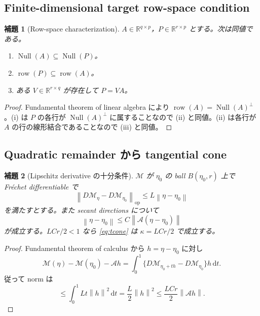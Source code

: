 \documentclass[11pt,a4paper]{ltjsarticle}
\newtheorem{lemma}{補題}[section]
\theoremstyle{remark}
\newcommand{\R}{\mathbb R}
\newcommand{\dd}{\,\mathrm d}
\newcommand{\norm}[1]{\left\lVert#1\right\rVert}
\newcommand{\Mop}{\mathscr M}
\newcommand{\Aop}{\mathscr A}
\newcommand{\Null}{\operatorname{Null}}
\newcommand{\row}{\operatorname{row}}
\newcommand{\op}{\operatorname{op}}
\begin{document}
\subsection{Finite-dimensional target row-space condition}
\begin{lemma}[Row-space characterization]\label{lem:rowspace}
$A\in\R^{q\times p}$，$P\in\R^{r\times p}$ とする。次は同値である。
\begin{enumerate}[label=(\roman*)]
\item $\Null(A)\subseteq\Null(P)$。
\item $\row(P)\subseteq\row(A)$。
\item ある $V\in\R^{r\times q}$ が存在して $P=VA$。
\end{enumerate}
\end{lemma}

\begin{proof}
Fundamental theorem of linear algebra により $\row(A)=\Null(A)^\perp$。(i) は $P$ の各行が $\Null(A)^\perp$ に属することなので (ii) と同値。(ii) は各行が $A$ の行の線形結合であることなので (iii) と同値。
\end{proof}

\subsection{Quadratic remainder から tangential cone}
\begin{lemma}[Lipschitz derivative の十分条件]\label{lem:tconeLipschitz}
$\Mop$ が $\eta_0$ の ball $B(\eta_0,r)$ 上で Fr\'echet differentiable で
\[
\norm{D\Mop_\eta-D\Mop_{\eta_0}}_{\op}
\le L\norm{\eta-\eta_0}
\]
を満たすとする。また secant directions について
\[
\norm{\eta-\eta_0}
\le C\norm{\Aop(\eta-\eta_0)}
\]
が成立する。$LCr/2<1$ なら \eqref{eq:tcone} は $\kappa=LCr/2$ で成立する。
\end{lemma}

\begin{proof}
Fundamental theorem of calculus から $h=\eta-\eta_0$ に対し
\[
\Mop(\eta)-\Mop(\eta_0)-\Aop h
=\int_0^1\{D\Mop_{\eta_0+th}-D\Mop_{\eta_0}\}h\dd t.
\]
従って norm は
\[
\le\int_0^1Lt\norm h^2\dd t
=\frac L2\norm h^2
\le\frac{LCr}{2}\norm{\Aop h}.
\]
\end{proof}
\end{document}
